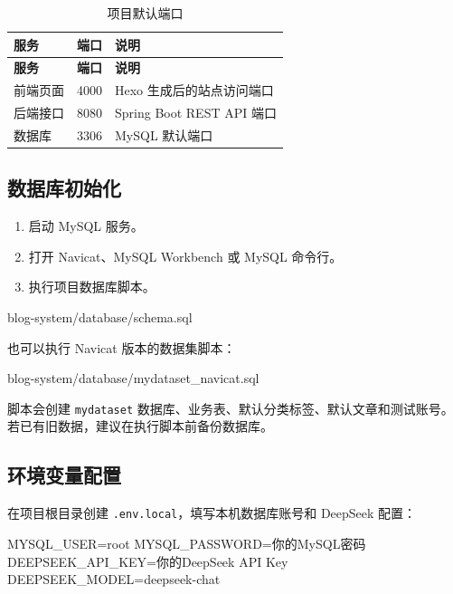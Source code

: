 \documentclass[UTF8,a4paper,12pt]{ctexart}
\newcommand{\code}[1]{\texttt{#1}}
\begin{document}
\begin{longtable}{p{4cm}p{5cm}p{5cm}}
\caption{项目默认端口}\\
\toprule
\rowcolor{tablehead}\textbf{服务} & \textbf{端口} & \textbf{说明}\\
\midrule
\endfirsthead
\toprule
\rowcolor{tablehead}\textbf{服务} & \textbf{端口} & \textbf{说明}\\
\midrule
\endhead
前端页面 & 4000 & Hexo 生成后的站点访问端口\\
后端接口 & 8080 & Spring Boot REST API 端口\\
数据库 & 3306 & MySQL 默认端口\\
\bottomrule
\end{longtable}

\subsection{数据库初始化}

\begin{enumerate}
  \item 启动 MySQL 服务。
  \item 打开 Navicat、MySQL Workbench 或 MySQL 命令行。
  \item 执行项目数据库脚本。
\end{enumerate}

\begin{codeblock}
blog-system/database/schema.sql
\end{codeblock}

也可以执行 Navicat 版本的数据集脚本：

\begin{codeblock}
blog-system/database/mydataset_navicat.sql
\end{codeblock}

脚本会创建 \code{mydataset} 数据库、业务表、默认分类标签、默认文章和测试账号。若已有旧数据，建议在执行脚本前备份数据库。

\subsection{环境变量配置}

在项目根目录创建 \code{.env.local}，填写本机数据库账号和 DeepSeek 配置：

\begin{codeblock}
MYSQL_USER=root
MYSQL_PASSWORD=你的MySQL密码
DEEPSEEK_API_KEY=你的DeepSeek API Key
DEEPSEEK_MODEL=deepseek-chat
\end{codeblock}
\end{document}
